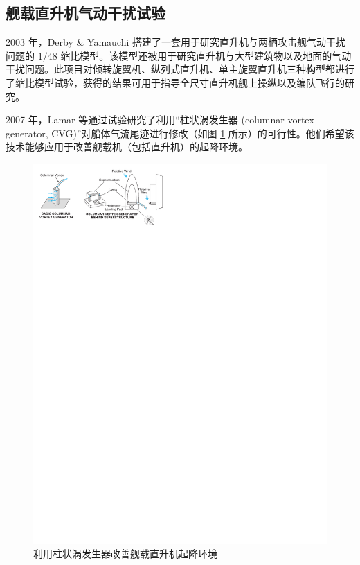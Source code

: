 \subsection{舰载直升机气动干扰试验}

2003 年，Derby \& Yamauchi 搭建了一套用于研究直升机与两栖攻击舰气动干扰问题的
$1/48$ 缩比模型。该模型还被用于研究直升机与大型建筑物以及地面的气动干扰问题。此项目对倾转旋翼机、纵列式直升机、单主旋翼直升机三种构型都进行了缩比模型试验，获得的结果可用于指导全尺寸直升机舰上操纵以及编队飞行的研究。

2007 年，Lamar 等通过试验研究了利用“柱状涡发生器 (columnar
vortex generator, CVG)”对船体气流尾迹进行修改（如图 \ref{fig:CVG} 所示）的可行性。他们希望该技术能够应用于改善舰载机（包括直升机）的起降环境。
\begin{figure}[h!]
\centering{}\includegraphics[width=1\textwidth,height=0.24\textheight,keepaspectratio]{../review/figures/modifying}
\caption{\label{fig:CVG}利用柱状涡发生器改善舰载直升机起降环境}
\end{figure}

